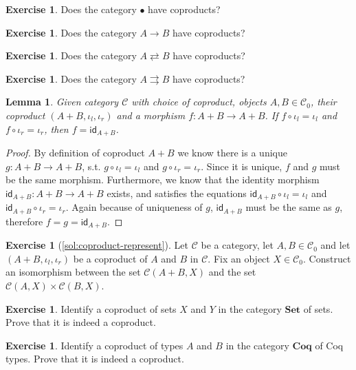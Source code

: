 \documentclass[a4paper,11pt, oneside,titlepage=false]{scrbook}
\theoremstyle{plain}
\newtheorem{lemma}[thm]{Lemma}
\theoremstyle{definition}
\newtheorem{exer}[thm]{Exercise}
\newcommand{\cfont}[1]{\ensuremath{\mathsf{#1}}}
\newcommand{\Cat}[1]{\mathcal{#1}}
\newcommand{\CC}{\Cat{C}}
\newcommand{\Catb}[1]{\mathbf{#1}}
\newcommand{\SET}{\Catb{Set}}
\newcommand{\COQ}{\Catb{Coq}}
\newcommand{\Ob}[1]{{#1}_0}
\newcommand{\Id}[1][]{\cfont{id}_{#1}}
\newcommand{\inl}{\ensuremath{\iota_l}}
\newcommand{\inr}{\ensuremath{\iota_r}}
\newcommand{\co}[2]{\ensuremath{#2 \circ #1}}
\begin{document}
\begin{exer}
  Does the category $\bullet$ have coproducts?
\end{exer}

\begin{exer}
  Does the category $A \to B$ have coproducts?
\end{exer}

\begin{exer}
  Does the category $A \rightleftarrows B$ have coproducts?
\end{exer}

\begin{exer}
  Does the category $A \rightrightarrows B$ have coproducts?
\end{exer}


\begin{lemma}
\label{lemma}
Given category $\CC$ with choice of coproduct, objects $A,B\in \Ob{\CC}$, their coproduct $(A+B,\inl,\inr)$ and a morphism $f:A+B\to A+B$. If $\co {\inl} {f}=\inl$ and $\co {\inr} {f}=\inr$, then $f=\Id[A+B]$.
\end{lemma}
\begin{proof}
By definition of coproduct $A+B$ we know there is a unique $g: A+B \to A+B$, s.t. $\co {\inl} {g}=\inl$ and $\co {\inr} {g}=\inr$. Since it is unique, $f$ and $g$ must be the same morphism. Furthermore, we know that the identity morphism $\Id[A+B]: A+B \to A+B$ exists, and satisfies the equations $\co {\inl} {\Id[A+B]} = \inl$ and $\co {\inr} {\Id[A+B]} = \inr$. Again because of uniqueness of $g$, $\Id[A+B]$ must be the same as $g$, therefore $f=g=\Id[A+B]$.
\end{proof}


\begin{exer}[\cref{sol:coproduct-represent}] \label{exer:coproduct-represent}
Let $\CC$ be a category, let $A,B\in\Ob{\CC}$ and let $(A+B,\inl,\inr)$ be a coproduct of $A$ and $B$ in $\CC$. Fix an object $X\in\Ob{\CC}$. Construct an isomorphism between the set $\CC(A+B,X)$ and the set $\CC(A,X)\times\CC(B,X)$.
\end{exer}



\begin{exer}\label{exer:coproduct_set}
  Identify a coproduct of sets $X$ and $Y$ in the category $\SET$ of sets.
  Prove that it is indeed a coproduct.
\end{exer}

\begin{exer}
  Identify a coproduct of types $A$ and $B$ in the category $\COQ$ of Coq types.
  Prove that it is indeed a coproduct.
\end{exer}
\end{document}
